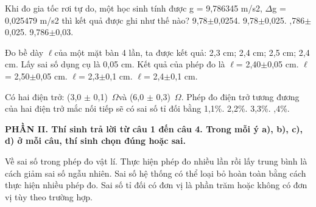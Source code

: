 \begin{ex}
Khi đo gia tốc rơi tự do, một học sinh tính được g = 9,786345 m/s2, $\Delta$g =
0,025479 m/s2 thì kết quả được ghi như thế nào?
\choice
{9,78$\pm$0,0254.}
{9,78$\pm$0,025.}
{,786$\pm$0,025.}
{9,786$\pm$0,03.}
\end{ex}

\begin{ex}
Đo bề dày $\ell$của một mặt bàn 4 lần, ta được kết quả: 2,3 cm; 2,4 cm; 2,5 cm;
2,4 cm. Lấy sai số dụng cụ là 0,05 cm. Kết quả của phép đo là
\choice
{$\ell$= 2,40$\pm$0,05 cm.}
{$\ell$= 2,50$\pm$0,05 cm.}
{$\ell$= 2,3$\pm$0,1 cm.}
{\True $\ell$= 2,4$\pm$0,1 cm.}
\end{ex}

\begin{ex}
Có hai điện trở: (3,0 $\pm$ 0,1) \,$\Omega$và (6,0 $\pm$ 0,3) \,$\Omega$. Phép đo điện trở tương đương
của hai điện trở mắc nối tiếp sẽ có sai số tỉ đối bằng
\choice
{1,1\%.}
{2,2\%.}
{3,3\%.}
{,4\%.}
\end{ex}

\vspace{0.4cm}\noindent\textbf{\large PHẦN II. Thí sinh trả lời từ câu 1 đến câu 4. Trong mỗi ý a), b), c), d) ở mỗi câu, thí sinh chọn đúng hoặc sai.}\par\vspace{0.2cm}
\begin{ex}
Về sai số trong phép đo vật lí.
{\True Thực hiện phép đo nhiều lần rồi lấy trung bình là cách giảm sai số ngẫu nhiên.}
{Sai số hệ thống có thể loại bỏ hoàn toàn bằng cách thực hiện nhiều phép đo.}
{Sai số tỉ đối có đơn vị là phần trăm hoặc không có đơn vị tùy theo trường hợp.}
\end{ex}

